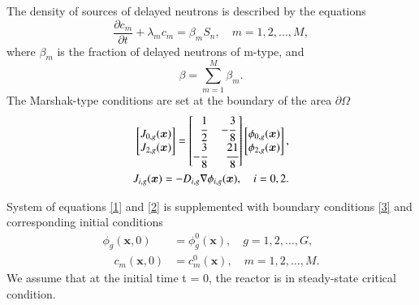 \documentclass[authoryear]{elsarticle}
\begin{document}
The density of sources of delayed neutrons is described by the equations
\begin{equation}\label{2}
	\frac{\partial c_m}{\partial t} + \lambda_m c_m = \beta_m S_{n}, \quad m = 1,2,\dots,M,
\end{equation}
where $\beta_m$ is the fraction of delayed neutrons of m-type, and
\[
	\beta = \sum_{m=1}^{M} \beta_m.
\] 
The Marshak-type conditions are set at the boundary of the area $\partial \Omega$
\begin{equation}\label{3}
\begin{split}
	\begin{bmatrix}
		J_{0,g}(\bm x) \\
		J_{2,g}(\bm x) \\
	\end{bmatrix}
	=
	\begin{bmatrix}
		\phantom{-} \cfrac{1}{2} & - \cfrac{3}{8} \\
	    -\cfrac{3}{8} & \phantom{-} \cfrac{21}{8} \\
	\end{bmatrix}
	\begin{bmatrix}
		\phi_{0,g}(\bm x) \\
		\phi_{2,g}(\bm x) \\
	\end{bmatrix}, \\
	J_{i,g}(\bm x) = - D_{i,g} \nabla \phi_{i,g}(\bm x), \quad i = 0, 2.
\end{split}
\end{equation}

System of equations \eqref{1} and \eqref{2} is supplemented with boundary conditions \eqref{3} and corresponding initial conditions
\begin{equation}\label{4}
\begin{split}
	\phi_g(\bm x,0) & = \phi_g^0(\bm x), \quad g = 1,2,\dots,G, \\ 
	\quad c_m(\bm x,0) & = c_m^0(\bm x), \quad m = 1,2,\dots,M.
\end{split}
\end{equation}
We assume that at the initial time t = 0, the reactor is in steady-state critical condition.
\end{document}
